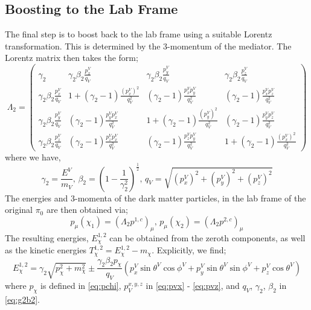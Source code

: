 \documentclass[10pt]{article}
\begin{document}
\subsection{Boosting to the Lab Frame}
The final step is to boost back to the lab frame using a suitable Lorentz transformation. This is determined by the $3$-momentum of the mediator. The Lorentz matrix then takes the form;
\begin{equation}
  \Lambda_2 = \begin{pmatrix} \gamma_2 & \gamma_2\beta_2 \frac{p^V_x}{q_V} & \gamma_2\beta_2 \frac{p^V_y}{q_V} & \gamma_2\beta_2 \frac{p^V_z}{q_V} \\ \gamma_2\beta_2 \frac{p^V_x}{q_V} & 1 + (\gamma_2 - 1)\frac{(p^V_x)^2}{q_V^2} & (\gamma_2 - 1)\frac{p^V_x p^V_y}{q_V^2} & (\gamma_2 - 1)\frac{p^V_x p^V_z}{q_V^2} \\ \gamma_2\beta_2 \frac{p^V_y}{q_V} & (\gamma_2 - 1)\frac{p^V_y p^V_x}{q_V^2} & 1 + (\gamma_2 - 1)\frac{(p^V_y)^2}{q_V^2} & (\gamma_2 - 1)\frac{p^V_y p^V_z}{q_V^2} \\ \gamma_2\beta_2 \frac{p^V_z}{q_V} & (\gamma_2 - 1)\frac{p^V_z p^V_x}{q_V^2} & (\gamma_2 - 1)\frac{p^V_z p^V_y}{q_V^2} & 1 + (\gamma_2 - 1)\frac{(p^V_x)^2}{q_V^2} \end{pmatrix}
\end{equation}
where we have,
\begin{equation}
  \label{eq:g2b2}
  \gamma_2 = \frac{E^V}{m_V}, \, \beta_2 = \left(1 - \frac{1}{\gamma_2^2}\right)^{\frac{1}{2}}, \, q_V = \sqrt{(p_x^V)^2 + (p_y^V)^2 + (p_z^V)^2}
\end{equation}
The energies and 3-momenta of the dark matter particles, in the lab frame of the original $\pi_0$ are then obtained via;
\begin{equation}
p_\mu(\chi_1) = (\Lambda_2 p^{1, c})_\mu, \, p_\mu(\chi_2) = (\Lambda_2 p^{2, c})_\mu
\end{equation}
The resulting energies, $E_\chi^{1, 2}$ can be obtained from the zeroth components, as well as the kinetic energies $T^{1, 2}_\chi = E_\chi^{1, 2} - m_\chi$. Explicitly, we find;
\begin{equation}
  E_{\chi}^{1, 2} = \gamma_2\sqrt{p_\chi^2 + m_\chi^2} \pm \frac{\gamma_2\beta_2p_\chi}{q_V}\left(p^V_x\sin\theta^V \cos\phi^V + p^V_y \sin\theta^V \sin\phi^V + p^V_z\cos\theta^V\right)
\end{equation}
where $p_\chi$ is defined in \eqref{eq:pchi}, $p_V^{x, y, z}$ in \eqref{eq:pvx} - \eqref{eq:pvz}, and $q_V$, $\gamma_2$, $\beta_2$ in \eqref{eq:g2b2}.
\end{document}
